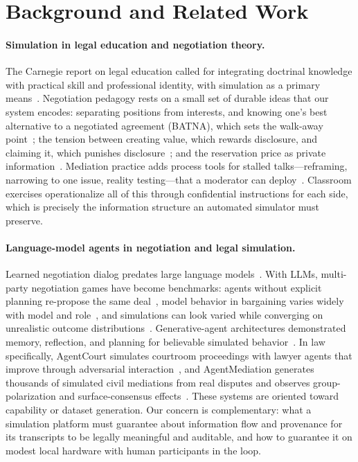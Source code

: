 \documentclass[acmsmall,screen,review]{acmart}
\begin{document}
\section{Background and Related Work}
\label{sec:related}

\paragraph{Simulation in legal education and negotiation theory.}
The Carnegie report on legal education called for integrating doctrinal knowledge with practical skill and professional identity, with simulation as a primary means~\cite{sullivan2007educating}. Negotiation pedagogy rests on a small set of durable ideas that our system encodes: separating positions from interests, and knowing one's best alternative to a negotiated agreement (BATNA), which sets the walk-away point~\cite{fisher2011yes}; the tension between creating value, which rewards disclosure, and claiming it, which punishes disclosure~\cite{mnookin2000beyond}; and the reservation price as private information~\cite{raiffa1982negotiation}. Mediation practice adds process tools for stalled talks---reframing, narrowing to one issue, reality testing---that a moderator can deploy~\cite{johnsen2026mediation}. Classroom exercises operationalize all of this through confidential instructions for each side, which is precisely the information structure an automated simulator must preserve.

\paragraph{Language-model agents in negotiation and legal simulation.}
Learned negotiation dialog predates large language models~\cite{lewis2017deal}. With LLMs, multi-party negotiation games have become benchmarks: agents without explicit planning re-propose the same deal~\cite{abdelnabi2023negotiation}, model behavior in bargaining varies widely with model and role~\cite{bianchi2024negotiationarena}, and simulations can look varied while converging on unrealistic outcome distributions~\cite{andric2026diversity}. Generative-agent architectures demonstrated memory, reflection, and planning for believable simulated behavior~\cite{park2023generative}. In law specifically, AgentCourt simulates courtroom proceedings with lawyer agents that improve through adversarial interaction~\cite{chen2025agentcourt}, and AgentMediation generates thousands of simulated civil mediations from real disputes and observes group-polarization and surface-consensus effects~\cite{chen2026agentmediation}. These systems are oriented toward capability or dataset generation. Our concern is complementary: what a simulation platform must guarantee about information flow and provenance for its transcripts to be legally meaningful and auditable, and how to guarantee it on modest local hardware with human participants in the loop.
\end{document}
